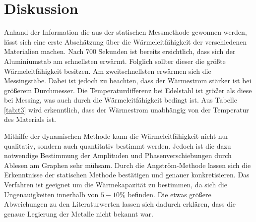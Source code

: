 \section{Diskussion}
\label{sec:Diskussion}
Anhand der Information die aus der statischen Messmethode gewonnen werden, lässt sich eine erste Abschätzung über die Wärmeleitfähigkeit der verschiedenen Materialien machen.
Nach 700 Sekunden ist bereits ersichtlich, dass sich der Aluminiumstab am schnellsten erwärmt.
Folglich sollter dieser die größte Wärmeleitfähigkeit besitzen.
Am zweitschnellsten erwärmen sich die Messingstäbe.
Dabei ist jedoch zu beachten, dass der Wärmestrom stärker ist bei größerem Durchmesser.
Die Temperaturdifferenz bei Edelstahl ist größer als diese bei Messing, was auch durch die Wärmeleitfähigkeit bedingt ist.
Aus Tabelle \ref{tab:t3} wird erkenntlich, dass der Wärmestrom unabhängig von der Temperatur des Materials ist.

Mithilfe der dynamischen Methode kann die Wärmeleitfähigkeit nicht nur qualitativ, sondern auch quantitativ bestimmt werden.
Jedoch ist die dazu notwendige Bestimmung der Amplituden und Phasenverschiebungen durch Ablesen am Graphen sehr mühsam.
Durch die Angström-Methode lassen sich die Erkenntnisse der statischen Methode bestätigen und genauer konkretisieren.
Das Verfahren ist geeignet um die Wärmekapazität zu bestimmen, da sich die Ungenauigkeiten innerhalb von $5-10\%$ befinden.
Die etwas größere Abweichungen zu den Literaturwerten \cite{waermeleit} lassen sich dadurch erklären, dass die genaue Legierung der Metalle nicht bekannt war.
